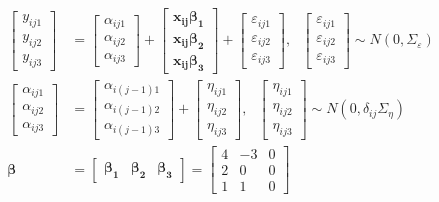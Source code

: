 \documentclass[
]{article}
\begin{document}
\begin{equation*}
\begin{aligned}
\begin{bmatrix}
y_{ij1}\\
y_{ij2}\\
y_{ij3}
\end{bmatrix}
&= \begin{bmatrix}
\alpha_{ij1}\\
\alpha_{ij2}\\
\alpha_{ij3}
\end{bmatrix}
+ 
\begin{bmatrix}
\boldsymbol{x_{ij}\beta_1}\\
\boldsymbol{x_{ij}\beta_2}\\
\boldsymbol{x_{ij}\beta_3} 
\end{bmatrix} +
\begin{bmatrix}
\varepsilon_{ij1}\\
\varepsilon_{ij2}\\
\varepsilon_{ij3}
\end{bmatrix}, \ \ \ 
\begin{bmatrix}
\varepsilon_{ij1}\\
\varepsilon_{ij2}\\
\varepsilon_{ij3}
\end{bmatrix} 
\sim N(0, \Sigma_\varepsilon
)\\
\begin{bmatrix}
\alpha_{ij1}\\
\alpha_{ij2}\\
\alpha_{ij3}
\end{bmatrix} & = 
\begin{bmatrix}
\alpha_{i(j-1)1}\\
\alpha_{i(j-1)2}\\
\alpha_{i(j-1)3}
\end{bmatrix} +
\begin{bmatrix}
\eta_{ij1}\\
\eta_{ij2}\\
\eta_{ij3}
\end{bmatrix}, \ \ \
\begin{bmatrix}
\eta_{ij1}\\
\eta_{ij2}\\
\eta_{ij3}
\end{bmatrix} \sim N(0, \delta_{ij} \Sigma_\eta 
)\\
\boldsymbol{\beta} &= \begin{bmatrix} \boldsymbol{\beta_1} & \boldsymbol{\beta_2} &  \boldsymbol{\beta_3} \end{bmatrix} = 
\begin{bmatrix}
4 & -3 & 0\\
2 & 0 & 0\\
1 & 1 & 0
\end{bmatrix}
\end{aligned}
\end{equation*}
\end{document}
